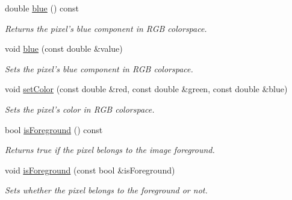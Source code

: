 \begin{CompactItemize}
double \hyperlink{class_pixel_978b4078a48ff2a67b55dd10eec78fb2}{blue} () const 
\begin{CompactList}\small\item\em Returns the pixel's blue component in RGB colorspace. \item\end{CompactList}\item 
void \hyperlink{class_pixel_d70e2f2a8ca1f25dca0cd67097f24eba}{blue} (const double \&value)
\begin{CompactList}\small\item\em Sets the pixel's blue component in RGB colorspace. \item\end{CompactList}\item 
void \hyperlink{class_pixel_6ab0eea0f05f228f5e314cb0c3894eca}{setColor} (const double \&red, const double \&green, const double \&blue)
\begin{CompactList}\small\item\em Sets the pixel's color in RGB colorspace. \item\end{CompactList}\item 
bool \hyperlink{class_pixel_48f2d29f9542f9c2ce293422ab07ffcc}{isForeground} () const 
\begin{CompactList}\small\item\em Returns true if the pixel belongs to the image foreground. \item\end{CompactList}\item 
void \hyperlink{class_pixel_d3007fd841eee762c9a1becc293f12db}{isForeground} (const bool \&isForeground)
\begin{CompactList}\small\item\em Sets whether the pixel belongs to the foreground or not. \item\end{CompactList}\end{CompactItemize}
